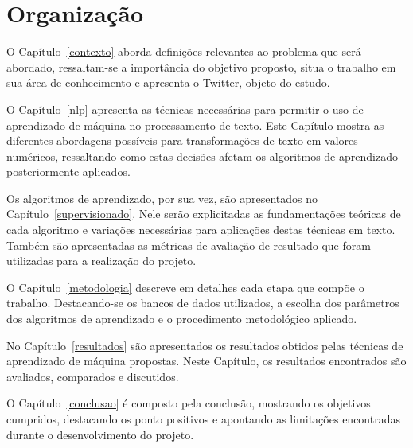 \section{Organização}

O Capítulo~\ref{contexto} aborda definições relevantes ao problema que será abordado, ressaltam-se a importância do
objetivo proposto, situa o trabalho em sua área de conhecimento e apresenta o Twitter, objeto do estudo.

O Capítulo~\ref{nlp} apresenta as técnicas necessárias para permitir o uso de aprendizado de máquina no processamento de
texto.
Este Capítulo mostra as diferentes abordagens possíveis para transformações de texto em valores numéricos, ressaltando
como estas decisões afetam os algoritmos de aprendizado posteriormente aplicados.

Os algoritmos de aprendizado, por sua vez, são apresentados no Capítulo~\ref{supervisionado}.
Nele serão explicitadas as fundamentações teóricas de cada algoritmo e variações necessárias para aplicações destas
técnicas em texto.
Também são apresentadas as métricas de avaliação de resultado que foram utilizadas para a realização do projeto.

O Capítulo~\ref{metodologia} descreve em detalhes cada etapa que compõe o trabalho.
Destacando-se os bancos de dados utilizados, a escolha dos parâmetros dos algoritmos de aprendizado e o procedimento
metodológico aplicado.

No Capítulo~\ref{resultados} são apresentados os resultados obtidos pelas técnicas de aprendizado de máquina propostas.
Neste Capítulo, os resultados encontrados são avaliados, comparados e discutidos.

O Capítulo~\ref{conclusao} é composto pela conclusão, mostrando os objetivos cumpridos, destacando os ponto positivos e
apontando as limitações encontradas durante o desenvolvimento do projeto.

